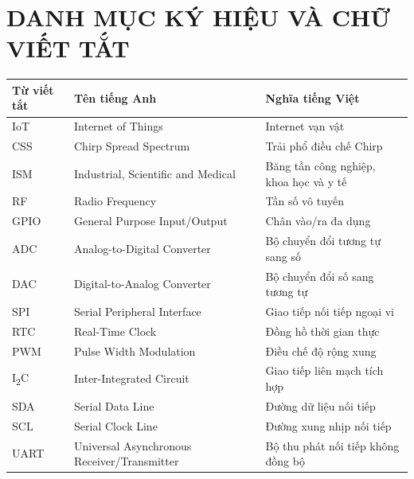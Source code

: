 \documentclass{article}
\begin{document}
	\cleardoublepage
	
	\newpage 
	\renewcommand{\contentsname}{MỤC LỤC}
	\tableofcontents 
	\thispagestyle{empty}
	\cleardoublepage
	\newpage
	
	\section*{DANH MỤC KÝ HIỆU VÀ CHỮ VIẾT TẮT}
	 {}
	
	\begin{table}[h!]
		\centering
		\renewcommand{\arraystretch}{1.3}
		\begin{tabular}{|>{\centering\arraybackslash}p{2.5cm}
				|>{\centering\arraybackslash}p{6cm}
				|>{\centering\arraybackslash}p{6cm}|}
			\hline
			\textbf{Từ viết tắt} & \textbf{Tên tiếng Anh} & \textbf{Nghĩa tiếng Việt} \\ \hline
			IoT & Internet of Things & Internet vạn vật \\ \hline
			CSS & Chirp Spread Spectrum & Trải phổ điều chế Chirp \\ \hline
			ISM & Industrial, Scientific and Medical & Băng tần công nghiệp, khoa học và y tế \\ \hline
			RF & Radio Frequency & Tần số vô tuyến \\ \hline
			GPIO & General Purpose Input/Output & Chân vào/ra đa dụng \\ \hline
			ADC & Analog-to-Digital Converter & Bộ chuyển đổi tương tự sang số \\ \hline
			DAC & Digital-to-Analog Converter & Bộ chuyển đổi số sang tương tự \\ \hline
			SPI & Serial Peripheral Interface & Giao tiếp nối tiếp ngoại vi \\ \hline
			RTC & Real-Time Clock & Đồng hồ thời gian thực \\ \hline
			PWM & Pulse Width Modulation & Điều chế độ rộng xung \\ \hline
			I\textsubscript{2}C & Inter-Integrated Circuit & Giao tiếp liên mạch tích hợp \\ \hline
			SDA & Serial Data Line & Đường dữ liệu nối tiếp \\ \hline
			SCL & Serial Clock Line & Đường xung nhịp nối tiếp \\ \hline
			UART & Universal Asynchronous Receiver/Transmitter & Bộ thu phát nối tiếp không đồng bộ \\ \hline

\end{tabular}
\end{table}
\end{document}
